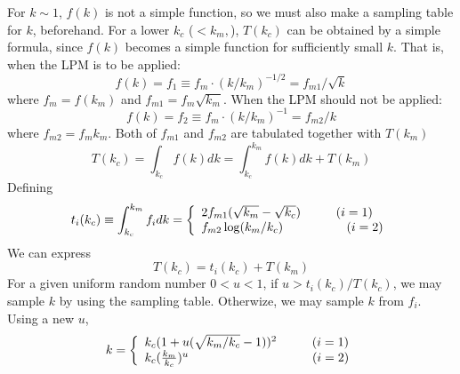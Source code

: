 \documentclass[a4paper]{article}
\begin{document}
  For $k\sim 1$, $f(k)$ is not a simple function, so we must
   also make a sampling table for $k$,
  beforehand.
  For a lower $k_c$ ($<k_m,$),
  $T(k_c)$ can be obtained by a simple formula, since $f(k)$
  becomes a simple function for sufficiently small $k$.
  That is,
  when the LPM is to be applied:
  \begin{equation}
 f(k) =f_1\equiv  f_m\cdot(k/k_m)^{-1/2} =f_{m1}/\sqrt{k}  
  \end{equation}
  where $f_m=f(k_m)$ and $f_{m1}=f_m\sqrt{k_m}$.
When the LPM should not be applied:
  \begin{equation}  
f(k)=f_2\equiv  f_m\cdot(k/k_m)^{-1} = f_{m2}/k
  \end{equation}
  where  $f_{m2}=f_mk_m$.
  Both of $f_{m1}$ and $f_{m2}$ are tabulated together with
  $T(k_m)$
  \begin{equation}  
T(k_c)= \int_{k_c}  f(k)dk = \int_{k_c}^{k_m}f(k)dk + T(k_m)
\end{equation}
Defining
  \begin{equation}  
   t_i(k_c) \equiv  \int_{k_c}^{k_m}f_idk
=  \left \{
\begin{array}{l}
2f_{m1}(\sqrt{k_m}-\sqrt{k_c}) \hspace{1cm}(i=1)\\
f_{m2}\log(k_m/k_c)\hspace{1.8cm}(i=2)
\end{array}
\right.
  \end{equation}
%
We can express
  \begin{equation}  
T(k_c)= t_i(k_c) + T(k_m)
\end{equation}
 For a given uniform random number $0<u<1$,
if $u>t_i(k_c)/T(k_c)$,  we may sample $k$ by using the sampling table.
Otherwize, we may  sample $k$ from $f_i$.  Using a new $u$,
  \begin{equation}  
   k=  \left \{
\begin{array}{l}
k_c(1+u(\sqrt{k_m/k_c} -1))^2\hspace{1cm}(i=1)\\
k_c(\frac{k_m}{k_c})^u\hspace{3.5cm}(i=2)\\
\end{array}
\right.
  \end{equation}
  
\end{document}
